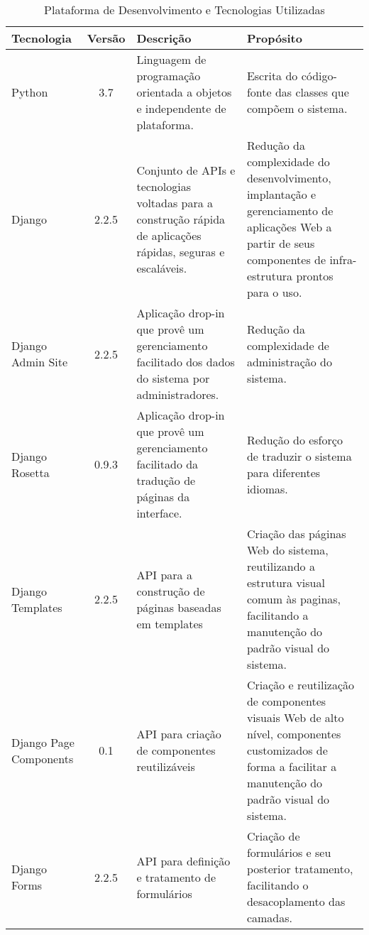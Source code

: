 \begin{table}[h]
	\centering	
	\vspace{0.5cm}
	\footnotesize
	\caption{Plataforma de Desenvolvimento e Tecnologias Utilizadas}	
	\label{tabela-plataforma}
	\begin{tabular}{|p{1.6cm}|c|p{5cm}|p{6.5cm}|}  \hline 
 		Tecnologia & Versão & Descrição & Propósito \\\hline 

		Python & 3.7 & Linguagem de programação orientada a objetos e independente de plataforma. & Escrita do código-fonte das classes que compõem o sistema. \\\hline
 		
		Django & 2.2.5 & Conjunto de APIs e tecnologias voltadas para a construção rápida de aplicações rápidas, seguras e escaláveis. & Redução da complexidade do desenvolvimento, implantação e gerenciamento de aplicações Web a partir de seus componentes de infra-estrutura prontos para o uso. \\ \hline
 		
		Django Admin Site & 2.2.5 & Aplicação drop-in que provê um gerenciamento facilitado dos dados do sistema por administradores. & Redução da complexidade de administração do sistema. \\ \hline
		
		Django Rosetta & 0.9.3 & Aplicação drop-in que provê um gerenciamento facilitado da tradução de páginas da interface. & Redução do esforço de traduzir o sistema para diferentes idiomas. \\ \hline
		
		Django Templates & 2.2.5 & API para a construção de páginas baseadas em templates & Criação das páginas Web do sistema, reutilizando a estrutura visual comum às paginas, facilitando a manutenção do padrão visual do sistema.  \\ \hline
		
		Django Page Components & 0.1 & API para criação de componentes reutilizáveis & Criação e reutilização de componentes visuais Web de alto nível, componentes customizados de forma a facilitar a manutenção do padrão visual do sistema. \\ \hline
		
		Django Forms & 2.2.5 & API para definição e tratamento de formulários & Criação de formulários e seu posterior tratamento, facilitando o desacoplamento das camadas. \\ \hline
		
		

\end{tabular}
\end{table}
